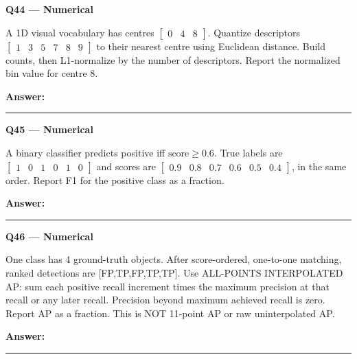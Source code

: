\documentclass[11pt,a4paper]{article}
\begin{document}
\par\vspace{12pt}
\begin{minipage}{\linewidth}
\textbf{Q44 — Numerical}\par\smallskip
A 1D visual vocabulary has centres \(\begin{bmatrix}0&4&8\end{bmatrix}\). Quantize descriptors \(\begin{bmatrix}1&3&5&7&8&9\end{bmatrix}\) to their nearest centre using Euclidean distance. Build counts,\allowbreak{} then L1-normalize by the number of descriptors. Report the normalized bin value for centre 8.
\par\medskip\textbf{Answer:} \rule{55mm}{0.4pt}
\end{minipage}
\par\vspace{12pt}
\begin{minipage}{\linewidth}
\textbf{Q45 — Numerical}\par\smallskip
A binary classifier predicts positive iff \(\text{score}\ge0.6\). True labels are \(\begin{bmatrix}1&0&1&0&1&0\end{bmatrix}\) and scores are \(\begin{bmatrix}0.9&0.8&0.7&0.6&0.5&0.4\end{bmatrix}\),\allowbreak{} in the same order. Report F1 for the positive class as a fraction.
\par\medskip\textbf{Answer:} \rule{55mm}{0.4pt}
\end{minipage}
\par\vspace{12pt}
\begin{minipage}{\linewidth}
\textbf{Q46 — Numerical}\par\smallskip
One class has 4 ground-truth objects. After score-ordered,\allowbreak{} one-to-one matching,\allowbreak{} ranked detections are [FP,\allowbreak{}TP,\allowbreak{}FP,\allowbreak{}TP,\allowbreak{}TP]. Use ALL-POINTS INTERPOLATED AP: sum each positive recall increment times the maximum precision at that recall or any later recall. Precision beyond maximum achieved recall is zero. Report AP as a fraction. This is NOT 11-point AP or raw uninterpolated AP.
\par\medskip\textbf{Answer:} \rule{55mm}{0.4pt}
\end{minipage}
\par\vspace{12pt}
\end{document}
